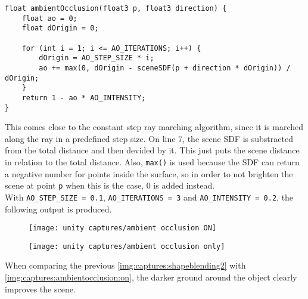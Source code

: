 \begin{lstlisting}[language=HLSL, caption=Implementation of ambient occlusion., label=lst:shader:ambientocclusion]
float ambientOcclusion(float3 p, float3 direction) {
    float ao = 0;
    float dOrigin = 0;

    for (int i = 1; i <= AO_ITERATIONS; i++) {
        dOrigin = AO_STEP_SIZE * i;
        ao += max(0, dOrigin - sceneSDF(p + direction * dOrigin)) / dOrigin;
    }
    return 1 - ao * AO_INTENSITY;
}
\end{lstlisting}

\noindent
This comes close to the constant step ray marching algorithm, since it is marched along the ray in a predefined step size.
On line 7, the scene SDF is substracted from the total distance and then devided by it. This just puts the scene distance in relation to the total distance.
Also, \lstinline[language=HLSL]{max()} is used because the SDF can return a negative number for points inside the surface, so in order to not brighten the scene at point \lstinline[language=HLSL]{p} when this is the case, 0 is added instead.
\\
With \lstinline[language=HLSL]{AO_STEP_SIZE = 0.1}, \lstinline[language=HLSL]{AO_ITERATIONS = 3} and \lstinline[language=HLSL]{AO_INTENSITY = 0.2}, the following output is produced.

\begin{figure}[H]
    \centering
        \begin{minipage}{0.47\linewidth}
            \texttt{[image: unity captures/ambient occlusion ON]}
            \label{img:captures:ambientocclusion:on}
        \end{minipage}
    \hfill
        \begin{minipage}{0.47\linewidth}
            \texttt{[image: unity captures/ambient occlusion only]}
            \label{img:captures:ambientocclusion:only}
        \end{minipage}
\end{figure}

\noindent
When comparing the previous \autoref{img:captures:shapeblending2} with \autoref{img:captures:ambientocclusion:on}, the darker ground around the object clearly improves the scene.